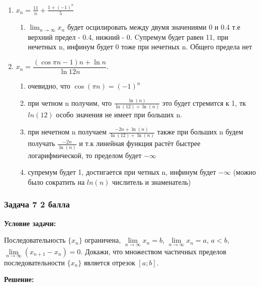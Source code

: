 \documentclass[a4paper,12pt]{article}
\begin{document}
\begin{enumerate}
    \item $x_n=\frac{11}{n}+\frac{1+(-1)^n}{5}$
    \begin{enumerate}
        \item $\lim_{n \to \infty} x_n$ будет осцилировать между двумя значениями 0 и 0.4 т.е верхний предел - 0.4, нижний - 0. Cупремум будет равен 11, при нечетных n, инфинум будет 0 тоже при нечетных n. Общего предела нет
    \end{enumerate}
    \item \( x_n = \dfrac{(\cos \pi n - 1) n + \ln n}{\ln 12n} \).
    \begin{enumerate}
        \item очевидно, что $\cos(\pi n ) = (-1)^n$
        \item при четном n получим, что  $\frac{\ln(n)}{\ln(12) + \ln(n)}$ это будет стремится к 1, тк $ln(12)$ особо значения не имеет при больших n. 
        \item при нечетном n получаем $\frac{-2n + \ln(n)}{\ln(12) + \ln(n)}$ также при больших n будем получать $\frac{-2n}{\ln(n)}$ и т.к линейная функция растёт быстрее логарифмической, то пределом будет $-\infty$
        \item супремум будет 1, достигается при четных n, инфинум будет $-\infty$ (можно было сократить на $ln(n)$ числитель и знаменатель)
    \end{enumerate}
\end{enumerate}

\vspace{1cm}

\subsubsection{Задача 7 \hfill 2 балла}

\textbf{Условие задачи:}

Последовательность \( \{ x_n \} \) ограничена, \( \lim\limits_{n \to \infty} x_n = b \), \( \lim\limits_{n \to \infty} x_n = a \), \( a < b \), \( \lim\limits_{n \to \infty} (x_{n+1} - x_n) = 0 \). Докажи, что множеством частичных пределов последовательности \( \{ x_n \} \) является отрезок \( [a; b] \).

\textbf{Решение: }
\end{document}
